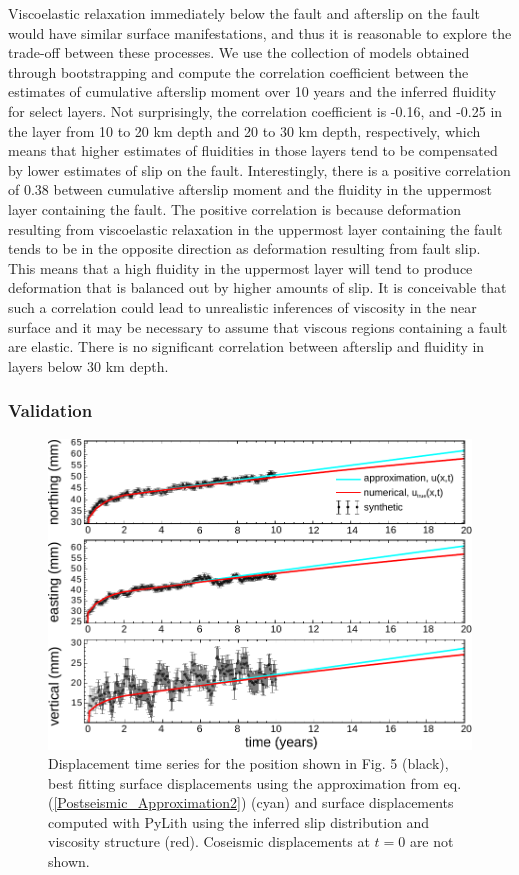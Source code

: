 \documentclass[extra,mreferee]{gji}
\begin{document}
Viscoelastic relaxation immediately below the fault and afterslip on
the fault would have similar surface manifestations, and thus it is
reasonable to explore the trade-off between these processes.  We use
the collection of models obtained through bootstrapping and compute
the correlation coefficient between the estimates of cumulative
afterslip moment over 10 years and the inferred fluidity for select
layers. Not surprisingly, the correlation coefficient is -0.16, and
-0.25 in the layer from 10 to 20 km depth and 20 to 30 km depth,
respectively, which means that higher estimates of fluidities in those
layers tend to be compensated by lower estimates of slip on the fault.
Interestingly, there is a positive correlation of 0.38 between
cumulative afterslip moment and the fluidity in the uppermost layer
containing the fault. The positive correlation is because deformation
resulting from viscoelastic relaxation in the uppermost layer
containing the fault tends to be in the opposite direction as deformation
resulting from fault slip. This means that a high fluidity in the
uppermost layer will tend to produce deformation that is balanced out by
higher amounts of slip.  It is conceivable that such a correlation
could lead to unrealistic inferences of viscosity in the near surface
and it may be necessary to assume that viscous regions containing a
fault are elastic.  There is no significant correlation between
afterslip and fluidity in layers below 30 km depth.

\subsubsection{Validation}\label{Validation}

\begin{figure}\label{figure6}
  \centering
  \includegraphics{figures/Fig6.pdf}
  \caption{Displacement time series for the position shown in Fig. 5
    (black), best fitting surface displacements using the
    approximation from eq. (\ref{Postseismic_Approximation2}) (cyan)
    and surface displacements computed with PyLith using the inferred
    slip distribution and viscosity structure (red). Coseismic displacements
    at $t=0$ are not shown.}
  \label{Figure 6}
\end{figure}
\end{document}

